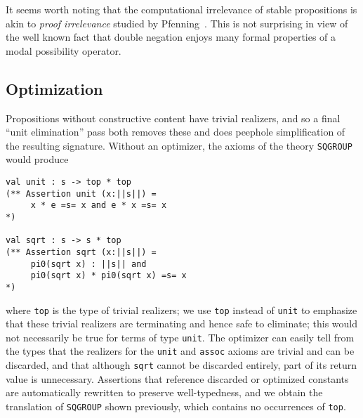 It seems worth noting that the computational irrelevance of
stable propositions is akin to \emph{proof irrelevance} studied by
Pfenning~\cite{pfenning01:_inten_exten_proof_irrel_modal_type_theor}.
This is not surprising in view of the well known fact that double
negation enjoys many formal properties of a modal possibility
operator.


\subsection{Optimization}

Propositions without constructive content have trivial realizers, and
so a final ``unit elimination'' pass both removes these and does 
peephole simplification of the resulting signature.   Without an optimizer,
the axioms of the theory \Verb|SQGROUP| would produce
\begin{Verbatim}
val unit : s -> top * top
(** Assertion unit (x:||s||) =  
     x * e =s= x and e * x =s= x
*)

val sqrt : s -> s * top
(** Assertion sqrt (x:||s||) =  
     pi0(sqrt x) : ||s|| and 
     pi0(sqrt x) * pi0(sqrt x) =s= x
*)
\end{Verbatim}
where \Verb|top| is the type of trivial realizers; we use 
\Verb|top| instead of \Verb|unit| to emphasize that these trivial realizers are terminating and hence safe to eliminate; this would not necessarily
be true for terms of type \Verb|unit|.  The optimizer can
easily tell from the types that the realizers for the \Verb|unit| and
\Verb|assoc| axioms are trivial and can be discarded, and that
although \Verb|sqrt| cannot be discarded entirely, part of its return
value is unnecessary.  Assertions that reference discarded or optimized
constants are automatically rewritten to preserve well-typedness, and we obtain the translation of \Verb|SQGROUP| shown previously, which contains no
occurrences of \Verb|top|.


